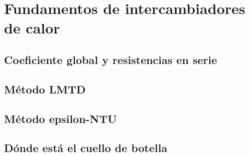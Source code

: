 \chapter{Fundamentos de intercambiadores de calor}
\label{ch:fundamentos_intercambiadores}

\begin{objetivos}
  \item {}
  \item {}
  \item {}
\end{objetivos}


\section{Coeficiente global y resistencias en serie}
\label{sec:fundamentos_intercambiadores:01}

\section{Método LMTD}
\label{sec:fundamentos_intercambiadores:02}

\section{Método epsilon-NTU}
\label{sec:fundamentos_intercambiadores:03}

\section{Dónde está el cuello de botella}
\label{sec:fundamentos_intercambiadores:04}


\begin{caso}
\end{caso}

